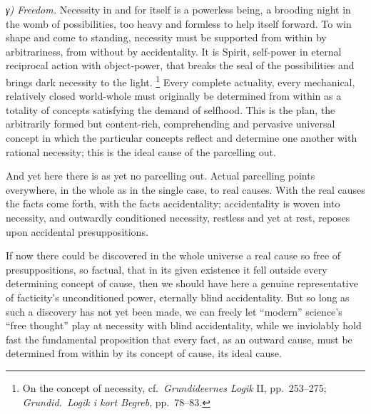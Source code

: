 \documentclass[12pt,a4paper]{book}
\renewcommand{\thefootnote}{*)}
\newcommand{\subrunin}[1]{\emph{#1}\hspace{0.4em}}
\begin{document}
\subrunin{γ) Freedom.} Necessity in and for itself is a powerless being, a brooding night in the
womb of possibilities, too heavy and formless to help itself forward. To win shape and come to
standing, necessity must be supported from within by arbitrariness, from without by accidentality.
It is Spirit, self-power in eternal reciprocal action with object-power, that breaks the seal of the
possibilities and brings dark necessity to the light.%
\renewcommand{\thefootnote}{**)}%
\footnote{%
On the concept of necessity, cf.\ \textit{Grundideernes Logik} II, pp.\ 253--275;
\textit{Grundid.\ Logik i kort Begreb}, pp.\ 78--83.}%
\renewcommand{\thefootnote}{*)}
Every complete actuality, every mechanical, relatively closed world-whole must originally be
determined from within as a totality of concepts
satisfying the demand of selfhood. This is the plan, the arbitrarily formed but content-rich,
comprehending and pervasive universal concept in which the particular concepts reflect and determine
one another with rational necessity; this is the ideal cause of the parcelling out.

And yet here there is as yet no parcelling out. Actual parcelling points everywhere, in the whole as
in the single case, to real causes. With the real causes the facts come forth, with the facts
accidentality; accidentality is woven into necessity, and outwardly conditioned necessity, restless
and yet at rest, reposes upon accidental presuppositions.

If now there could be discovered in the whole universe a real cause so free of presuppositions, so
factual, that in its given existence it fell outside every determining concept of cause, then we
should have here a genuine representative of facticity's unconditioned power, eternally blind
accidentality. But so long as such a discovery has not yet been made, we can freely let ``modern''
science's ``free thought'' play at necessity with blind
accidentality, while we inviolably hold fast the fundamental proposition that every fact, as an
outward cause, must be determined from within by its concept of cause, its ideal cause.
\end{document}
